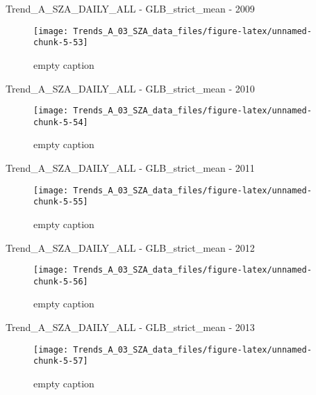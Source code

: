 \documentclass[
  10pt,
  a4paper,oneside]{article}
\begin{document}
Trend\_A\_SZA\_DAILY\_ALL - GLB\_strict\_mean - 2009

\begin{figure}[!ht]

{\centering \texttt{[image: Trends\_A\_03\_SZA\_data\_files/figure-latex/unnamed-chunk-5-53]} 

}

\caption{ empty caption }\label{fig:unnamed-chunk-5-53}
\end{figure}

Trend\_A\_SZA\_DAILY\_ALL - GLB\_strict\_mean - 2010

\begin{figure}[!ht]

{\centering \texttt{[image: Trends\_A\_03\_SZA\_data\_files/figure-latex/unnamed-chunk-5-54]} 

}

\caption{ empty caption }\label{fig:unnamed-chunk-5-54}
\end{figure}

Trend\_A\_SZA\_DAILY\_ALL - GLB\_strict\_mean - 2011

\begin{figure}[!ht]

{\centering \texttt{[image: Trends\_A\_03\_SZA\_data\_files/figure-latex/unnamed-chunk-5-55]} 

}

\caption{ empty caption }\label{fig:unnamed-chunk-5-55}
\end{figure}

Trend\_A\_SZA\_DAILY\_ALL - GLB\_strict\_mean - 2012

\begin{figure}[!ht]

{\centering \texttt{[image: Trends\_A\_03\_SZA\_data\_files/figure-latex/unnamed-chunk-5-56]} 

}

\caption{ empty caption }\label{fig:unnamed-chunk-5-56}
\end{figure}

Trend\_A\_SZA\_DAILY\_ALL - GLB\_strict\_mean - 2013

\begin{figure}[!ht]

{\centering \texttt{[image: Trends\_A\_03\_SZA\_data\_files/figure-latex/unnamed-chunk-5-57]} 

}

\caption{ empty caption }\label{fig:unnamed-chunk-5-57}
\end{figure}
\end{document}
